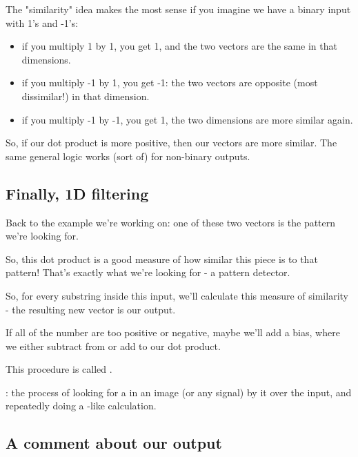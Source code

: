         The "similarity" idea makes the most sense if you imagine we have a binary input with 1's and -1's: 
        
        \begin{itemize}
            \item if you multiply 1 by 1, you get 1, and the two vectors are the same in that dimensions.
            \item if you multiply -1 by 1, you get -1: the two vectors are opposite (most dissimilar!) in that dimension.
            \item if you multiply -1 by -1, you get 1, the two dimensions are more similar again.
        \end{itemize}
        
        So, if our dot product is more positive, then our vectors are more similar. The same general logic works (sort of) for non-binary outputs.
    
    \subsection{Finally, 1D filtering}
    
        Back to the example we're working on: one of these two vectors is the pattern we're looking for. 
        
        So, this dot product is a good measure of how similar this piece is to that pattern! That's exactly what we're looking for - a pattern detector.
        
        So, for every substring inside this input, we'll calculate this measure of similarity - the resulting new vector is our output.
        
        If all of the number are too positive or negative, maybe we'll add a bias, where we either subtract from or add to our dot product. 
        
        This procedure is called .\\
        
        \begin{definition}
            : the process of looking for a  in an image (or any signal) by  it over the input, and repeatedly doing a -like calculation.
        \end{definition}
    
    \subsection{A comment about our output}
    
